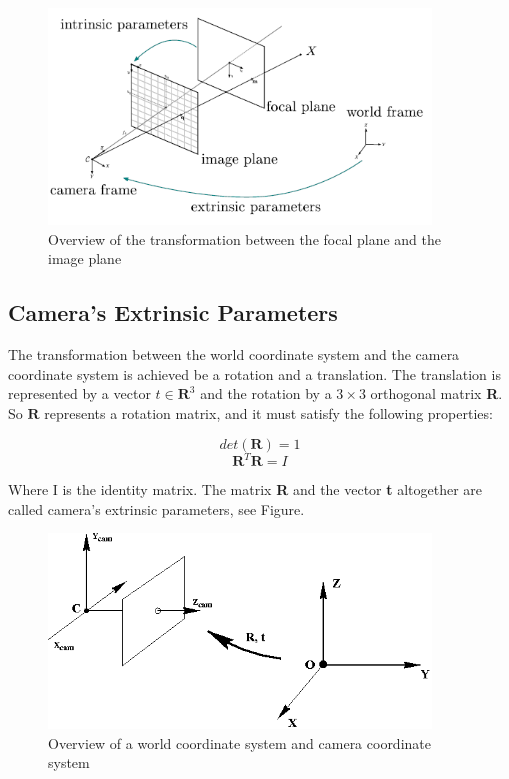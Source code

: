 \begin{figure}[!h]
\begin{center}
\includegraphics[width=4in]{figures02/intrinsic.png}
\caption{Overview of the transformation between the focal plane and the image plane}%
\label{fig:intrinsic}
\end{center}
\end{figure}


\subsection{Camera's Extrinsic Parameters}

The transformation between the world coordinate system and the camera coordinate system is achieved be a rotation and a translation. The translation is represented by a vector $t \in \textbf{R}^{3}$ and the rotation by a $3\times3$ orthogonal matrix \textbf{R}. So $\textbf{R}$ represents a rotation matrix, and it must satisfy the following properties:

\begin{equation}\label{eq3} 
     det(\textbf{R})=1 
\end{equation}
\begin{equation}\label{eq4}  
    \textbf{R}^{T}\textbf{R}=I      
\end{equation}


Where I is the identity matrix. The matrix \textbf{R} and the vector \textbf{t} altogether are called camera's extrinsic parameters, see Figure.

\begin{figure}[!h]
\begin{center}
\includegraphics[width=4in]{figures02/extrinsic.png}
\caption{Overview of a world coordinate system and camera coordinate system}%
\end{center}
\end{figure}


